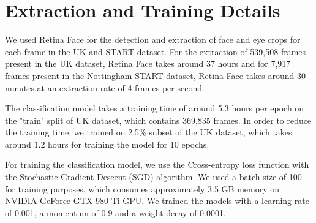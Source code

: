 \section{Extraction and Training Details}
We used Retina Face for the detection and extraction of face and eye crops for each frame in the UK and START dataset. For the extraction of 539,508 frames present in the UK dataset, Retina Face takes around 37 hours and for 7,917 frames present in the Nottingham START dataset, Retina Face takes around 30 minutes at an extraction rate of 4 frames per second.

The classification model takes a training time of around 5.3 hours per epoch on the "train" split of UK dataset, which contains 369,835 frames. In order to reduce the training time, we trained on 2.5\% subset of the UK dataset, which takes around 1.2 hours for training the model for 10 epochs.

For training the classification model, we use the Cross-entropy loss function with the Stochastic Gradient Descent (SGD) algorithm. We used a batch size of 100 for training purposes, which consumes approximately 3.5 GB memory on NVIDIA GeForce GTX 980 Ti GPU. We trained the models with a learning rate of 0.001, a momentum of 0.9 and a weight decay of 0.0001.